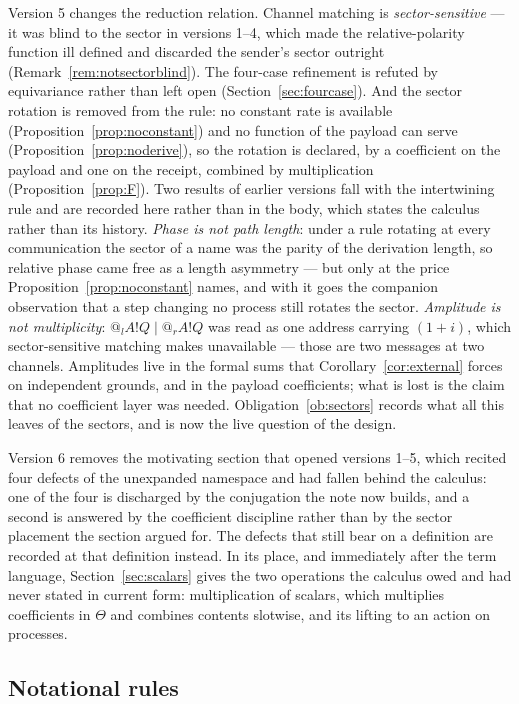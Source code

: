 \documentclass[11pt]{article}
\makeatletter
\theoremstyle{definition}
\theoremstyle{remark}
\newcommand{\quo}[1]{\ensuremath{@_{#1}}}
\makeatother
\begin{document}
Version 5 changes the reduction relation. Channel matching is
\emph{sector-sensitive} --- it was blind to the sector in versions 1--4, which
made the relative-polarity function ill defined and discarded the sender's
sector outright (Remark~\ref{rem:notsectorblind}). The four-case refinement is
refuted by equivariance rather than left open (Section~\ref{sec:fourcase}). And
the sector rotation is removed from the rule: no constant rate is available
(Proposition~\ref{prop:noconstant}) and no function of the payload can serve
(Proposition~\ref{prop:noderive}), so the rotation is declared, by a coefficient
on the payload and one on the receipt, combined by multiplication
(Proposition~\ref{prop:F}). Two results of earlier versions fall with the intertwining rule and are recorded
here rather than in the body, which states the calculus rather than its history.
\emph{Phase is not path length}: under a rule rotating at every communication the
sector of a name was the parity of the derivation length, so relative phase came
free as a length asymmetry --- but only at the price
Proposition~\ref{prop:noconstant} names, and with it goes the companion
observation that a step changing no process still rotates the sector.
\emph{Amplitude is not multiplicity}: $\quo{l}A!Q \mid \quo{r}A!Q$ was read as one
address carrying $(1+i)$, which sector-sensitive matching makes unavailable ---
those are two messages at two channels. Amplitudes live in the formal sums that
Corollary~\ref{cor:external} forces on independent grounds, and in the payload
coefficients; what is lost is the claim that no coefficient layer was needed.
Obligation~\ref{ob:sectors} records what all this leaves of the sectors, and is
now the live question of the design.

Version 6 removes the motivating section that opened versions 1--5, which
recited four defects of the unexpanded namespace and had fallen behind the
calculus: one of the four is discharged by the conjugation the note now builds,
and a second is answered by the coefficient discipline rather than by the sector
placement the section argued for. The defects that still bear on a definition are
recorded at that definition instead. In its place, and immediately after the term
language, Section~\ref{sec:scalars} gives the two operations the calculus owed
and had never stated in current form: multiplication of scalars, which
multiplies coefficients in $\Theta$ and combines contents slotwise, and its
lifting to an action on processes.

\subsection{Notational rules}
\end{document}
